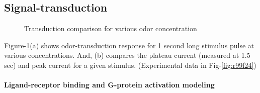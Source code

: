 \documentclass[
]{article}
\begin{document}
\hypertarget{signal-transduction}{%
\subsection{Signal-transduction}\label{signal-transduction}}

\begin{figure}

{\centering {}

}

\caption{Transduction comparison for various odor concentration}\label{fig:txCon}
\end{figure}

Figure-\ref{fig:txCon}(a) shows odor-transduction response for 1 second long stimulus pulse at various concentrations. And, (b) compares the plateau current (measured at 1.5 sec) and peak current for a given stimulus. (Experimental data in Fig-\ref{fig:r99f24})

\hypertarget{ligand-receptor-binding-and-g-protein-activation-modeling}{%
\paragraph*{Ligand-receptor binding and G-protein activation modeling}\label{ligand-receptor-binding-and-g-protein-activation-modeling}}
\end{document}
